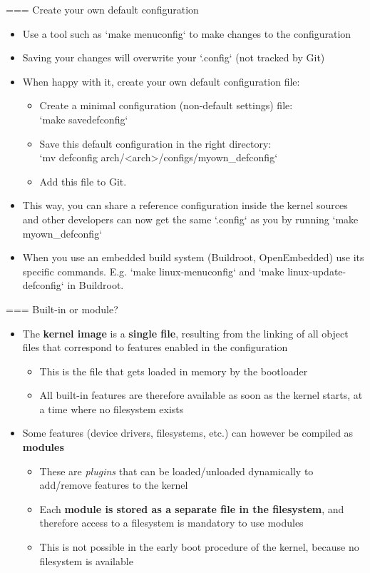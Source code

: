 === Create your own default configuration
  \begin{itemize}
    \item Use a tool such as `make menuconfig` to make changes to
      the configuration
    \item Saving your changes will overwrite your `.config` (not
      tracked by Git)
    \item When happy with it, create your own default configuration file:
      \begin{itemize}
      \item Create a minimal configuration (non-default settings) file:\\
        `make savedefconfig`
      \item Save this default configuration in the right directory:\\
        `mv defconfig arch/<arch>/configs/myown_defconfig`
      \item Add this file to Git.
      \end{itemize}
    \item This way, you can share a reference configuration inside
      the kernel sources and other developers can now get the same
      `.config` as you by running `make myown_defconfig`
    \item When you use an embedded build system (Buildroot, OpenEmbedded)
      use its specific commands. E.g. `make linux-menuconfig` and
      `make linux-update-defconfig` in Buildroot.
  \end{itemize}


=== Built-in or module?
  \begin{itemize}
  \item The {\bf kernel image} is a {\bf single file}, resulting from
    the linking of all object files that correspond to features
    enabled in the configuration
    \begin{itemize}
    \item This is the file that gets loaded in memory by the
      bootloader
    \item All built-in features are therefore available as soon as the
      kernel starts, at a time where no filesystem exists
    \end{itemize}
  \item Some features (device drivers, filesystems, etc.) can however
    be compiled as {\bf modules}
    \begin{itemize}
    \item These are {\em plugins} that can be loaded/unloaded dynamically to
      add/remove features to the kernel
    \item Each {\bf module is stored as a separate file in the
        filesystem}, and therefore access to a filesystem is mandatory
      to use modules
    \item This is not possible in the early boot procedure of the
      kernel, because no filesystem is available
    \end{itemize}
  \end{itemize}


